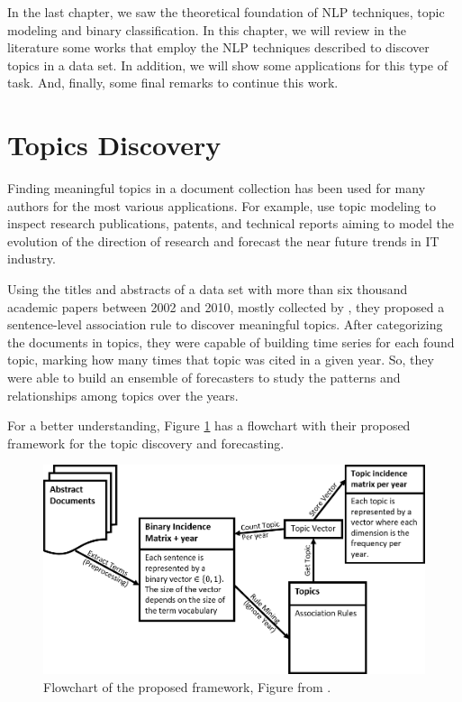 In the last chapter, we saw the theoretical foundation of NLP techniques, topic modeling and binary classification. In this chapter, we will review in the literature some works that employ the NLP techniques described to discover topics in a data set. In addition, we will show some applications for this type of task. And, finally, some final remarks to continue this work.


\section{Topics Discovery}

Finding meaningful topics in a document collection has been used for many authors for the most various applications. For example,  use topic modeling to inspect research publications, patents, and technical reports aiming to model the evolution of the direction of research and forecast the near future trends in IT industry.

Using the titles and abstracts of a data set with more than six thousand academic papers between 2002 and 2010, mostly collected by , they proposed a sentence-level association rule to discover meaningful topics. After categorizing the documents in topics, they were capable of building time series for each found topic, marking how many times that topic was cited in a given year. So, they were able to build an ensemble of forecasters to study the patterns and relationships among topics over the years.

For a better understanding, Figure \ref{fig:topic-discovery-framework} has a flowchart with their proposed framework for the topic discovery and forecasting.

\begin{figure}[h!]
	\centering
	\includegraphics[width=0.85\linewidth]{01.Chapters/03.RelatedWorks/topic-discovery-framework}
	\caption{Flowchart of the proposed framework, Figure from  \cite{hurtado2016topic}.}
	\label{fig:topic-discovery-framework}
\end{figure}

